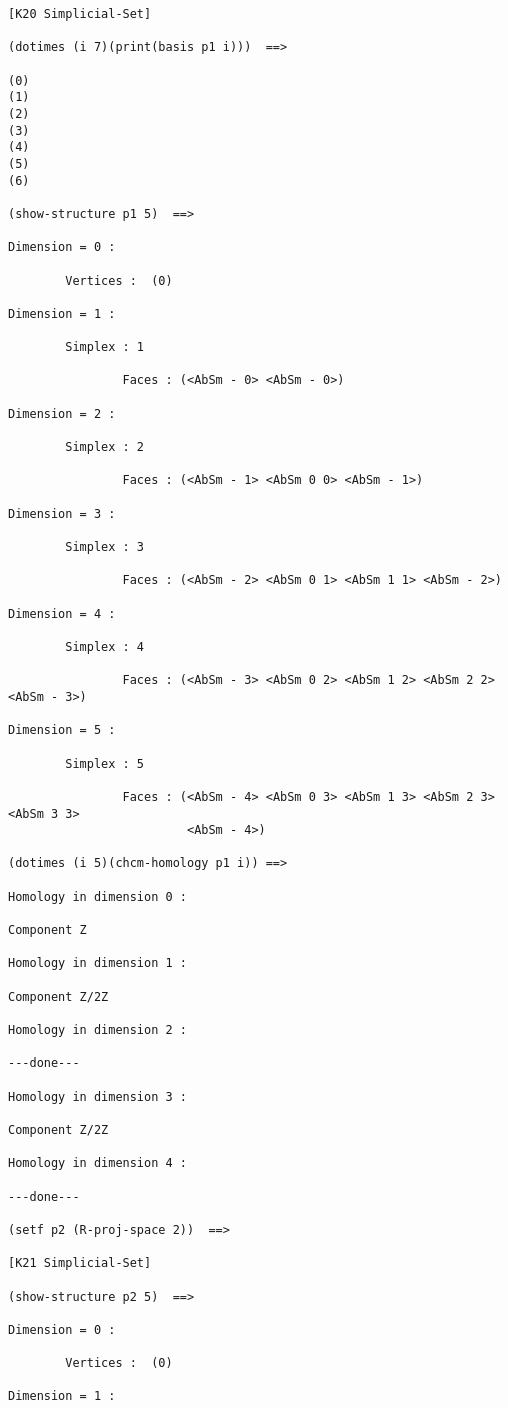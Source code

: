 {{\begin{verbatim}
[K20 Simplicial-Set]

(dotimes (i 7)(print(basis p1 i)))  ==>

(0)
(1)
(2)
(3)
(4)
(5)
(6)

(show-structure p1 5)  ==>

Dimension = 0 :

        Vertices :  (0)

Dimension = 1 :

        Simplex : 1

                Faces : (<AbSm - 0> <AbSm - 0>)

Dimension = 2 :

        Simplex : 2

                Faces : (<AbSm - 1> <AbSm 0 0> <AbSm - 1>)

Dimension = 3 :

        Simplex : 3

                Faces : (<AbSm - 2> <AbSm 0 1> <AbSm 1 1> <AbSm - 2>)

Dimension = 4 :

        Simplex : 4

                Faces : (<AbSm - 3> <AbSm 0 2> <AbSm 1 2> <AbSm 2 2> <AbSm - 3>)

Dimension = 5 :

        Simplex : 5

                Faces : (<AbSm - 4> <AbSm 0 3> <AbSm 1 3> <AbSm 2 3> <AbSm 3 3>
                         <AbSm - 4>)

(dotimes (i 5)(chcm-homology p1 i)) ==>

Homology in dimension 0 :

Component Z

Homology in dimension 1 :

Component Z/2Z

Homology in dimension 2 :

---done---

Homology in dimension 3 :

Component Z/2Z

Homology in dimension 4 :

---done---

(setf p2 (R-proj-space 2))  ==>

[K21 Simplicial-Set]

(show-structure p2 5)  ==>

Dimension = 0 :

        Vertices :  (0)

Dimension = 1 :


\end{verbatim}}}
